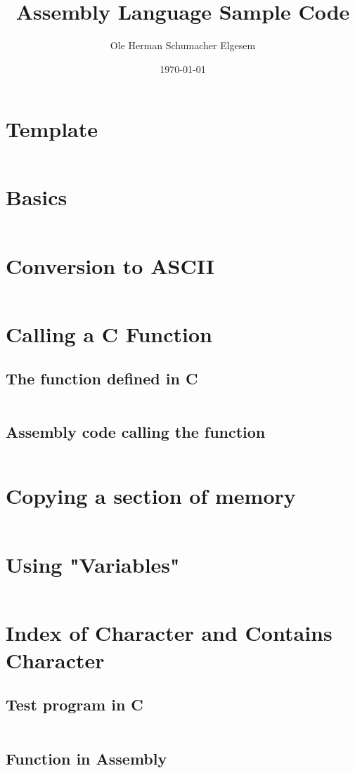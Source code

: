 \documentclass{article}
\title{Assembly Language Sample Code}
\author{Ole Herman Schumacher Elgesem}
\date{\today}
\begin{document}
\maketitle
\tableofcontents
\newpage
\section{Template}
\inputminted{text}{asmtemplate/asmtemplate.s}
\newpage
\section{Basics}
\inputminted{text}{asmBasics/asmBasics.s}
\newpage
\section{Conversion to ASCII}
\inputminted{text}{asciiConvert/asciiConvert.s}
\newpage
\section{Calling a C Function}
\subsection{The function defined in C}
\inputminted{c}{callCFunc/cFunc.c}
\subsection{Assembly code calling the function}
\inputminted{text}{callCFunc/callCFunc.s}
\newpage
\section{Copying a section of memory}
\inputminted{text}{memCopy/memCopy.s}
\section{Using "Variables"}
\inputminted{text}{variables/variables.s}
\section{Index of Character and Contains Character}
\subsection{Test program in C}
\inputminted{c}{indexOf/indexOf.c}
\newpage
\subsection{Function in Assembly}
\inputminted{text}{indexOf/indexOf.s}
\end{document}

